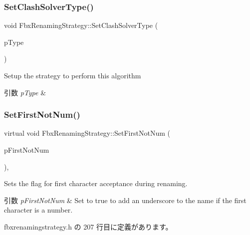 \subsubsection{\texorpdfstring{Set\+Clash\+Solver\+Type()}{SetClashSolverType()}}
{\footnotesize\ttfamily void Fbx\+Renaming\+Strategy\+::\+Set\+Clash\+Solver\+Type (\begin{DoxyParamCaption}\item[{\hyperlink{class_fbx_renaming_strategy_aacebe214cec13a6cdbbc9e40d16c57dd}{E\+Clash\+Type}}]{p\+Type }\end{DoxyParamCaption})}

Setup the strategy to perform this algorithm 
\begin{DoxyParams}{引数}
{\em p\+Type} & \\
\hline
\end{DoxyParams}
\mbox{\label{class_fbx_renaming_strategy_a0786472d7eeef7b817eb8dacbaebafa6}} 
\subsubsection{\texorpdfstring{Set\+First\+Not\+Num()}{SetFirstNotNum()}}
{\footnotesize\ttfamily virtual void Fbx\+Renaming\+Strategy\+::\+Set\+First\+Not\+Num (\begin{DoxyParamCaption}\item[{bool}]{p\+First\+Not\+Num }\end{DoxyParamCaption})\hspace{0.3cm}{\ttfamily [inline]}, {\ttfamily [virtual]}}

Sets the flag for first character acceptance during renaming. 
\begin{DoxyParams}{引数}
{\em p\+First\+Not\+Num} & Set to {\ttfamily true} to add an underscore to the name if the first character is a number. \\
\hline
\end{DoxyParams}


 fbxrenamingstrategy.\+h の 207 行目に定義があります。

\mbox{\label{class_fbx_renaming_strategy_a7326723f421c3f81a2a2bbaa95f979fe}} 
